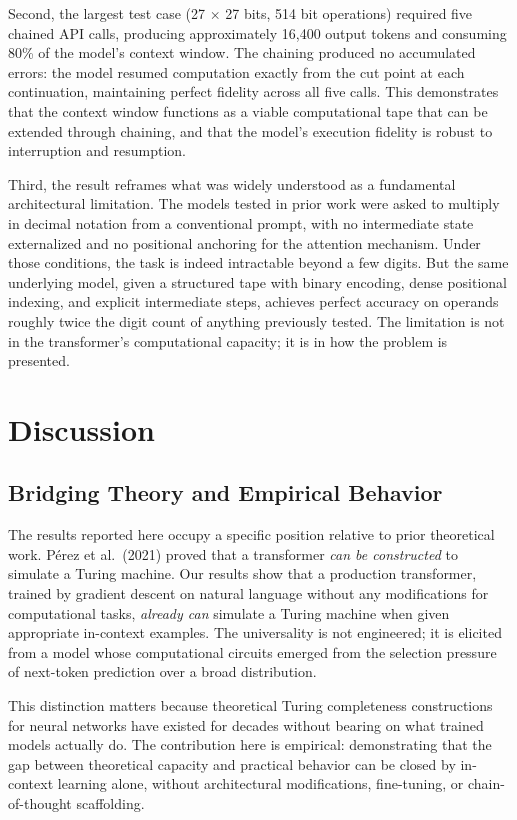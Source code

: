 \documentclass[twocolumn,switch,10pt]{article}
\begin{document}
Second, the largest test case (27 \(\times\) 27 bits, 514 bit operations) required five chained API calls, producing approximately 16,400 output tokens and consuming 80\% of the model's context window. The chaining produced no accumulated errors: the model resumed computation exactly from the cut point at each continuation, maintaining perfect fidelity across all five calls. This demonstrates that the context window functions as a viable computational tape that can be extended through chaining, and that the model's execution fidelity is robust to interruption and resumption.

Third, the result reframes what was widely understood as a fundamental architectural limitation. The models tested in prior work were asked to multiply in decimal notation from a conventional prompt, with no intermediate state externalized and no positional anchoring for the attention mechanism. Under those conditions, the task is indeed intractable beyond a few digits. But the same underlying model, given a structured tape with binary encoding, dense positional indexing, and explicit intermediate steps, achieves perfect accuracy on operands roughly twice the digit count of anything previously tested. The limitation is not in the transformer's computational capacity; it is in how the problem is presented.

\section{Discussion}\label{sec:discussion}

\subsection{Bridging Theory and Empirical Behavior}\label{bridging-theory-and-empirical-behavior}

The results reported here occupy a specific position relative to prior theoretical work. Pérez et al.~(2021) proved that a transformer \emph{can be constructed} to simulate a Turing machine. Our results show that a production transformer, trained by gradient descent on natural language without any modifications for computational tasks, \emph{already can} simulate a Turing machine when given appropriate in-context examples. The universality is not engineered; it is elicited from a model whose computational circuits emerged from the selection pressure of next-token prediction over a broad distribution.

This distinction matters because theoretical Turing completeness constructions for neural networks have existed for decades without bearing on what trained models actually do. The contribution here is empirical: demonstrating that the gap between theoretical capacity and practical behavior can be closed by in-context learning alone, without architectural modifications, fine-tuning, or chain-of-thought scaffolding.
\end{document}
